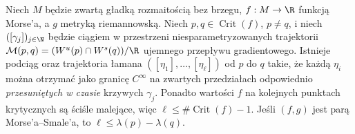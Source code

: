 \begin{twierdzenie}
\label{thm:morse-broken-compact-v11}
Niech $M$ będzie zwartą gładką rozmaitością bez brzegu,
$f:M\to\R$ funkcją Morse'a, a $g$ metryką riemannowską.
Niech $p,q\in\operatorname{Crit}(f)$, $p\ne q$, i niech
$([\gamma_j])_{j\in\N}$ będzie ciągiem w przestrzeni
niesparametryzowanych trajektorii
$\mathcal M(p,q)=(W^u(p)\cap W^s(q))/\R$
ujemnego przepływu gradientowego.
Istnieje podciąg oraz trajektoria łamana
$([\eta_1],\ldots,[\eta_\ell])$ od $p$ do $q$ takie, że
każdą $\eta_i$ można otrzymać jako granicę $C^\infty$
na zwartych przedziałach odpowiednio \emph{przesuniętych w czasie}
krzywych $\gamma_j$. Ponadto wartości $f$ na kolejnych
punktach krytycznych są ściśle malejące, więc
$\ell\le\#\operatorname{Crit}(f)-1$.
Jeśli $(f,g)$ jest parą Morse'a--Smale'a, to
$\ell\le\lambda(p)-\lambda(q)$.
\end{twierdzenie}

